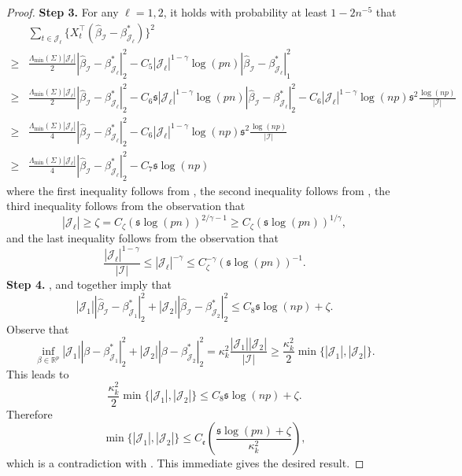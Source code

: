 \documentclass[11pt]{article}
\newcommand{\I}{{\mathcal I }}
\newcommand{\J}{{  \mathcal J } }
\newcommand{\s}{ { \mathfrak{s}  } }
\theoremstyle{plain}
\theoremstyle{definition}
\begin{document}
\begin{proof}
{\bf Step 3.} For any $\ell=1, 2$,
  it holds with probability at least $1 -2n^{-5}$ that
 \begin{align}\nonumber 
		&  \sum_{ t  \in \J_\ell  } \big\{ X_t ^\top  (  \widehat \beta _\I  -  \beta^* _{\J_ \ell  }) \big\}  ^2 
		 \\  \nonumber  
		  \ge&  \frac{\Lambda_{\min} (\Sigma) |\J_\ell | }{2}  |\widehat \beta _\I  -  \beta^* _{\J_ \ell  }  |_2^2 - C_5  |\J_\ell|^{1-\gamma }  \log(pn)  |\widehat \beta _\I  -  \beta^* _{\J_ \ell  }  |_1  ^2 
		 \\\nonumber  
		 \ge &  \frac{\Lambda_{\min} (\Sigma) |\J_\ell | }{2}  |\widehat \beta _\I  -  \beta^* _{\J_ \ell  }  |_2^2  -   C_6   \s  |\J_\ell|^{1-\gamma }   \log(pn)      |\widehat \beta _\I -  \beta^* _{\J_ \ell  }  |_2^2   -  C_6  |\J_\ell|^{1-\gamma } \log(np) \s^2     \frac{ \log(np)}{| \I|}   
		 \\ \nonumber 
		 \ge &  \frac{\Lambda_{\min} (\Sigma) |\J_\ell | }{4}  |\widehat \beta _\I  -  \beta^* _{\J_ \ell  }  |_2^2  -   C_6  |\J_\ell|^{1-\gamma } \log(np) \s^2     \frac{ \log(np)}{| \I|}      
		 \\ \label{eq:regression one change step 3 term 1}
		 \ge &   \frac{\Lambda_{\min} (\Sigma) |\J_\ell | }{4}  |\widehat \beta _\I  -  \beta^* _{\J_ \ell  }  |_2^2  -   C_7  \s  \log(np)      
	\end{align} 
	where the first inequality follows from   
 ,   the second inequality follows from ,     the third  inequality follows from the observation that 
 $$   |\J_\ell|   \ge \zeta   =  C_\zeta (\s\log(pn))^{2/\gamma -1 }\ge C_\zeta (\s\log(pn))^{1/\gamma   }, $$  
 and the last inequality follows from the observation that 
 $$  \frac{|\J_\ell  |^{1-\gamma}}{ |\I | }\le |\J_\ell| ^{-\gamma } \le C_\zeta^{-\gamma} (\s\log(pn))^{-1} .
 $$
{\bf Step 4.} ,   and  together  imply that 
 $$   |\J_1  |    |\widehat \beta _\I  -  \beta^* _{\J_ 1  }  |_2^2  + |\J_2  |    |\widehat \beta _\I  -  \beta^* _{\J_ 2  }  |_2^2  \le C_8 \s \log(np)  +  \zeta  .$$
Observe  that 
$$ \inf_{  \beta  \in \mathbb R ^p   }  |\J_1 |    | \beta    -  \beta^* _{\J_ 1  }  |_2^2  + |\J_2 |  |  \beta    -  \beta^* _{\J_ 2  }  |_2^2    = \kappa_k ^2  \frac{|\J_1| |\J_2|}{| \I| }   \ge \frac{ \kappa_k^2 }{2} \min\{ |\J_1| ,|\J_2| \}    . $$ 
This leads to 
$$  \frac{ \kappa_k^2 }{2}\min\{ |\J_1| ,|\J_2| \}    \le  C_8 \s \log(np)   + \zeta   .$$
Therefore
$$  \min\{ |\J_1| ,|\J_2| \}    \le  C_{\mathfrak e}  \left(\frac{ \s \log(pn)  + \zeta }{\kappa_k^2}\right),$$
which is a contradiction with . This immediate gives  the desired result.
\end{proof}
\end{document}
